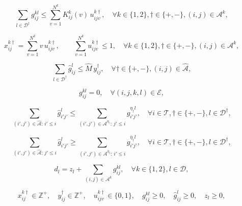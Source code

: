 \documentclass[10pt, reqno]{amsart}
\begin{document}
{\color{red}
\begin{equation}
\sum_{l \in \mathcal{D}^{\dagger}} g_{ij}^{kl} \le \sum_{v=1}^{N^k} K^k_{ij}(v)\, u_{ijv}^{k\dagger}, \quad \forall k \in \{1,2\}, \dagger \in \{+,-\}, (i,j) \in \mathcal{A}^k,\label{BHH}
\end{equation}

\begin{equation}
x_{ij}^{k\dagger} = \sum_{v=1}^{N^k} v\, u_{ijv}^{k\dagger}, \qquad \sum_{v=1}^{N^k} u_{ijv}^{k\dagger} \le 1, \quad \forall k \in \{1,2\}, \dagger \in \{+,-\}, (i,j) \in \mathcal{A}^k,\label{wave link}
\end{equation}

\begin{equation}
\sum_{l\in\mathcal{D}^{\dagger}}\hat{g}_{ij}^l \le \hat{M}\, y_{ij}^{\dagger}, \quad \forall \dagger \in \{+,-\}, (i,j) \in \hat{\mathcal{A}},\label{auto vol}
\end{equation}

\begin{equation}
g_{ij}^{kl} = 0, \quad \forall (i,j,k,l) \in \mathcal{E},\label{violate}
\end{equation}

\begin{equation}
\sum_{(i',j') \in \hat{\mathcal{A}} :\, i' \le i} \hat{g}_{i'j'}^l \le \sum_{(i',j') \in \mathcal{A}^{\eta_{\dagger}} :\, j' \le i} g_{i'j'}^{\eta_{\dagger} l}, \quad \forall i \in \mathcal{T}, \dagger \in \{+,-\}, l \in \mathcal{D}^{\dagger},\label{transfer step 1}
\end{equation}

\begin{equation}
\sum_{(i',j') \in \hat{\mathcal{A}} :\, j' \le i} \hat{g}_{i'j'}^l \ge \sum_{(i',j') \in \mathcal{A}^{\bar{\eta}_{\dagger}} :\, i' \le i} g_{i'j'}^{\bar{\eta}_{\dagger} l}, \quad \forall i \in \mathcal{T}, \dagger \in \{+,-\}, l \in \mathcal{D}^{\dagger},\label{transfer step 2}
\end{equation}

\begin{equation}
d_l = z_l + \sum_{(i,j) \in \mathcal{A}^k} g_{ij}^{kl}, \quad \forall k \in \{1,2\}, l \in \mathcal{D},\label{unserved}
\end{equation}

\begin{equation}
x_{ij}^{k\dagger} \in \mathbb{Z}^+,\quad y_{ij}^{\dagger} \in \mathbb{Z}^+,\quad u_{ijv}^{k\dagger} \in \{0,1\},\quad g_{ij}^{kl} \ge 0,\quad \hat{g}_{ij}^{l} \ge 0,\quad z_l \ge 0,\label{domain}
\end{equation}
}
\end{document}
